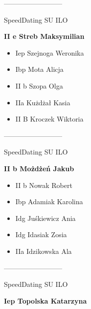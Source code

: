 \documentclass[a4paper,10pt]{article}
\begin{document}
\begin{multicols}{3}
\begin{minipage}[l]{\textwidth}
\begin{itemize}
    \end{itemize}



\end{minipage}



\begin{minipage}[l]{\textwidth}
--------------------------

  \footnotesize{SpeedDating SU ILO}

  \bfseries{II e Streb Maksymilian}

  \begin{itemize}
    \item Iep Szejnoga Weronika
    \item Ibp Mota Alicja
    \item II b Szopa Olga
    \item IIa Kużdżał Kasia
    \item II B Kroczek Wiktoria

    \end{itemize}



\end{minipage}



\begin{minipage}[l]{\textwidth}
--------------------------

  \footnotesize{SpeedDating SU ILO}

  \bfseries{II b Możdżeń Jakub}

  \begin{itemize}
    \item II b Nowak Robert
    \item Ibp Adamiak Karolina
    \item Idg Juśkiewicz Ania
    \item Idg Idasiak Zosia
    \item IIa Idzikowska Ala

    \end{itemize}



\end{minipage}



\begin{minipage}[l]{\textwidth}
--------------------------

  \footnotesize{SpeedDating SU ILO}

  \bfseries{Iep Topolska Katarzyna}


\end{minipage}
\end{multicols}
\end{document}

